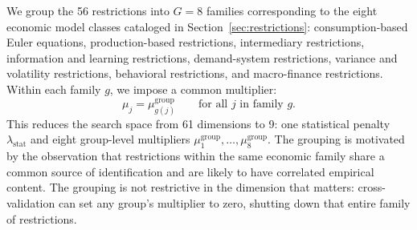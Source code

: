 We group the 56 restrictions into $G = 8$ families corresponding to the eight economic model classes cataloged in Section~\ref{sec:restrictions}: consumption-based Euler equations, production-based restrictions, intermediary restrictions, information and learning restrictions, demand-system restrictions, variance and volatility restrictions, behavioral restrictions, and macro-finance restrictions.
Within each family $g$, we impose a common multiplier:
\begin{equation}\label{eq:grouped_penalties}
\mu_j = \mu_{g(j)}^{\mathrm{group}} \qquad \text{for all } j \text{ in family } g.
\end{equation}
This reduces the search space from 61 dimensions to 9: one statistical penalty $\lambda_{\mathrm{stat}}$ and eight group-level multipliers $\mu_1^{\mathrm{group}}, \ldots, \mu_8^{\mathrm{group}}$.
The grouping is motivated by the observation that restrictions within the same economic family share a common source of identification and are likely to have correlated empirical content.
The grouping is not restrictive in the dimension that matters: cross-validation can set any group's multiplier to zero, shutting down that entire family of restrictions.

